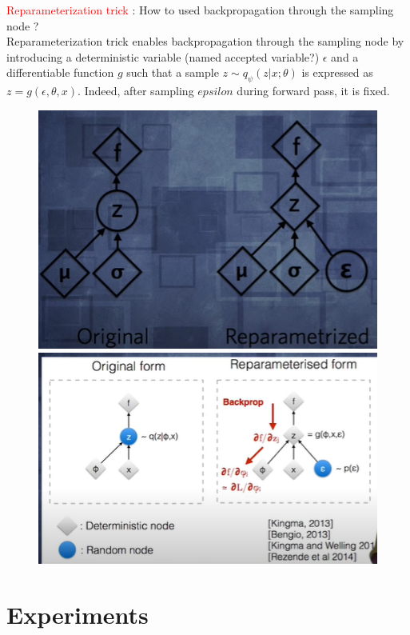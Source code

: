 \documentclass[12pt]{article}
\newcommand{\red}[1]{\textcolor{red}{#1}}
\begin{document}
\red{Reparameterization trick} :
How to used backpropagation through the sampling node ? \\
Reparameterization trick enables backpropagation through the sampling node by introducing a deterministic variable (named accepted variable?) $\epsilon$ and a differentiable function $g$ 
such that a sample $z\sim q_\psi(z|x; \theta)$ is expressed as $z=g(\epsilon, \theta, x)$. Indeed, after sampling $epsilon$ during forward pass, it is fixed.
\begin{figure}[!h]
    \includegraphics[scale=0.4]{figures/reparametrization.png}
    \includegraphics[scale=0.4]{figures/reparam_backprop.png}
\end{figure}

\section{Experiments}
\end{document}
